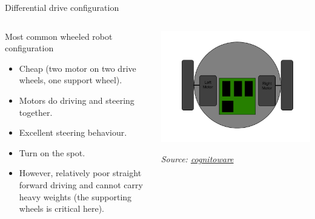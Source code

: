 \documentclass[compress]{beamer}
\newcommand{\source}[2]{{\tiny\it Source: \href{#1}{#2}}}
\begin{document}
\begin{frame}{Differential drive configuration}

    \begin{columns}
        \begin{column}{0.6\linewidth}

            Most common wheeled robot configuration

            \begin{itemize}
                \item Cheap (two motor on two drive wheels, one support wheel).
                \item Motors do driving and steering together.
                \item Excellent steering behaviour.
                \item Turn on the spot.
                \item However, relatively poor straight forward driving and cannot carry
                    heavy weights (the supporting wheels is critical here).
            \end{itemize}
        \end{column}
        \begin{column}{0.4\linewidth}

        \begin{center}
            \includegraphics[width=0.8\linewidth]{differentialdrive}

            \source{cognitoware.com}{cognitoware}
        \end{center}
        \end{column}
    \end{columns}

\end{frame}
\end{document}
